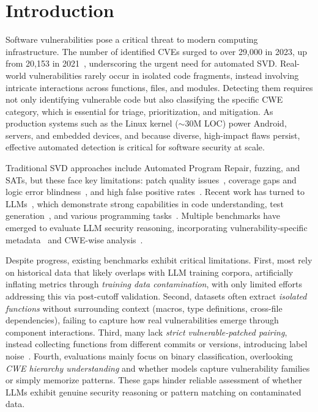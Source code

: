 \documentclass[lettersize,journal]{IEEEtran}
\begin{document}
\section{Introduction}

Software vulnerabilities pose a critical threat to modern computing infrastructure. The number of identified CVEs surged to over 29,000 in 2023, up from 20,153 in 2021~\cite{cvedetails2024}, underscoring the urgent need for automated \gls{SVD}. Real-world vulnerabilities rarely occur in isolated code fragments, instead involving intricate interactions across functions, files, and modules. Detecting them requires not only identifying vulnerable code but also classifying the specific \gls{CWE} category, which is essential for triage, prioritization, and mitigation. As production systems such as the Linux kernel ($\sim$30M LOC) power Android, servers, and embedded devices, and because diverse, high-impact flaws persist, effective automated detection is critical for software security at scale.

Traditional \gls{SVD} approaches include Automated Program Repair, fuzzing, and \glspl{SAT}, but these face key limitations: patch quality issues~\cite{huang2023survey, zhang2023survey}, coverage gaps and logic error blindness~\cite{manes2019art, klees2018evaluating}, and high false positive rates~\cite{pereira2021machine}. Recent work has turned to \glspl{LLM}~\cite{chen2021evaluating, touvron2023llama, dubey2024llama, feng2020codebert, li2022competition}, which demonstrate strong capabilities in code understanding, test generation~\cite{alshahwan2024automated, wang2024software}, and various programming tasks~\cite{fan2023large}. Multiple benchmarks have emerged to evaluate \gls{LLM} security reasoning, incorporating vulnerability-specific metadata~\cite{siddiq2022securityeval, liu2024vuldetectbench, sun2024llm4vuln} and CWE-wise analysis~\cite{khare2025understanding, ullah2024llms}.

Despite progress, existing benchmarks exhibit critical limitations. First, most rely on historical data that likely overlaps with \gls{LLM} training corpora, artificially inflating metrics through \emph{training data contamination}, with only limited efforts~\cite{ullah2024llms} addressing this via post-cutoff validation. Second, datasets often extract \emph{isolated functions} without surrounding context (macros, type definitions, cross-file dependencies), failing to capture how real vulnerabilities emerge through component interactions. Third, many lack \emph{strict vulnerable-patched pairing}, instead collecting functions from different commits or versions, introducing label noise~\cite{gao2023far, iannone2022secret, croft2023data}. Fourth, evaluations mainly focus on binary classification, overlooking \emph{CWE hierarchy understanding} and whether models capture vulnerability families or simply memorize patterns. These gaps hinder reliable assessment of whether \glspl{LLM} exhibit genuine security reasoning or pattern matching on contaminated data.
\end{document}
